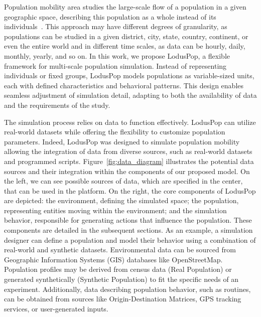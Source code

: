 \documentclass[pdflatex,sn-mathphys-num]{sn-jnl}%
\newcommand\red[1]{#1}
\theoremstyle{thmstyleone}%
\theoremstyle{thmstyletwo}%
\theoremstyle{thmstylethree}%
\begin{document}
Population mobility area studies the large-scale flow of a population in a given geographic space, describing this population as a whole instead of its individuals~\citep{brockmann2006scaling,gonzalez2008understanding}. This approach may have different degrees of granularity, as populations can be studied in a given district, city, state, country, continent, or even the entire world and in different time scales, as data can be hourly, daily, monthly, yearly, and so on. 
\red{In this work, we propose LodusPop, a flexible framework for multi-scale population simulation. Instead of representing individuals or fixed groups, LodusPop models populations as variable-sized units, each with defined characteristics and behavioral patterns. This design enables seamless adjustment of simulation detail, adapting to both the availability of data and the requirements of the study.}

The simulation process relies on data to function effectively. LodusPop can utilize real-world datasets while offering the flexibility to customize population parameters. Indeed, LodusPop was designed to simulate population mobility allowing the integration of data from diverse sources, such as real-world datasets and programmed scripts. 
\red{Figure~\ref{fig:data_diagram} illustrates the potential data sources and their integration within the components of our proposed model.}
On the left, we can see possible sources of data, which are specified in the center, that can be used in the platform. On the right, the core components of \red{LodusPop} are depicted: the environment, defining the simulated space; the population, representing entities moving within the environment; and the simulation behavior, responsible for generating actions that influence the population. These components are detailed in the subsequent sections. %
As an example, a simulation designer can define a population and model their behavior using a combination of real-world and synthetic datasets. Environmental data can be sourced from Geographic Information Systems (GIS) databases like OpenStreetMap. Population profiles may be derived from census data (Real Population) or generated synthetically (Synthetic Population) to fit the specific needs of an experiment. Additionally, data describing population behavior, such as routines, can be obtained from sources like Origin-Destination Matrices, GPS tracking services, or user-generated inputs.
\end{document}
